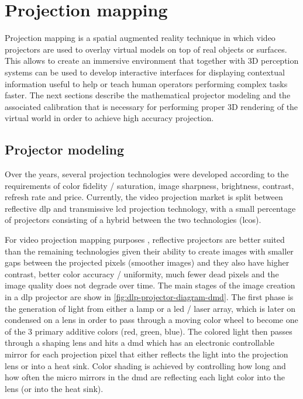 \section{Projection mapping}

Projection mapping is a spatial augmented reality \cite{Bimber2005} technique in which video projectors are used to overlay virtual models on top of real objects or surfaces. This allows to create an immersive environment that together with 3D perception systems can be used to develop interactive interfaces for displaying contextual information useful to help or teach human operators performing complex tasks faster. The next sections describe the mathematical projector modeling and the associated calibration that is necessary for performing proper 3D rendering of the virtual world in order to achieve high accuracy projection.


\subsection{Projector modeling}

Over the years, several projection technologies were developed according to the requirements of color fidelity / saturation, image sharpness, brightness, contrast, refresh rate and price. Currently, the video projection market is split between reflective \gls{dlp} and transmissive \gls{lcd} projection technology, with a small percentage of projectors consisting of a hybrid between the two technologies (\gls{lcos}).

For video projection mapping purposes \cite{Raskar1998,Bimber2005,Tan2013,Fujimoto2014}, reflective projectors are better suited than the remaining technologies given their ability to create images with smaller gaps between the projected pixels (smoother images) and they also have higher contrast, better color accuracy / uniformity, much fewer dead pixels and the image quality does not degrade over time. The main stages of the image creation in a \gls{dlp} projector are show in \cref{fig:dlp-projector-diagram-dmd}. The first phase is the generation of light from either a lamp or a \gls{led} / laser array, which is later on condensed on a lens in order to pass through a moving color wheel to become one of the 3 primary additive colors (red, green, blue). The colored light then passes through a shaping lens and hits a \gls{dmd} which has an electronic controllable mirror for each projection pixel that either reflects the light into the projection lens or into a heat sink. Color shading is achieved by controlling how long and how often the micro mirrors in the \gls{dmd} are reflecting each light color into the lens (or into the heat sink).


